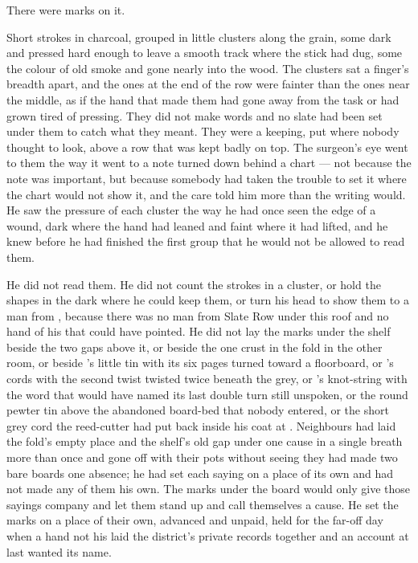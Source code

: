 There were marks on it.

Short strokes in charcoal, grouped in little clusters along the grain, some dark and pressed hard enough to leave a smooth track where the stick had dug, some the colour of old smoke and gone nearly into the wood. The clusters sat a finger's breadth apart, and the ones at the end of the row were fainter than the ones near the middle, as if the hand that made them had gone away from the task or had grown tired of pressing. They did not make  words and no slate had been set under them to catch what they meant. They were a keeping, put where nobody thought to look, above a row that was kept badly on top. The surgeon's eye went to them the way it went to a note turned down behind a chart --- not because the note was important, but because somebody had taken the trouble to set it where the chart would not show it, and the care told him more than the writing would. He saw the pressure of each cluster the way he had once seen the edge of a wound, dark where the hand had leaned and faint where it had lifted, and he knew before he had finished the first group that he would not be allowed to read them.

He did not read them. He did not count the strokes in a cluster, or hold the shapes in the dark where he could keep them, or turn his head to show them to a man from , because there was no man from Slate Row under this roof and no hand of his that could have pointed. He did not lay the marks under the shelf beside the two gaps above it, or beside the one crust in the fold in the other room, or beside 's little tin with its six pages turned toward a floorboard, or 's cords with the second twist twisted twice beneath the grey, or 's knot-string with the word that would have named its last double turn still unspoken, or the round pewter tin above the abandoned board-bed that nobody entered, or the short grey cord the reed-cutter had put back inside his coat at . Neighbours had laid the fold's empty place and the shelf's old gap under one cause in a single breath more than once and gone off with their pots without seeing they had made two bare boards one absence; he had set each saying on a place of its own and had not made any of them his own. The marks under the board would only give those sayings company and let them stand up and call themselves a cause. He set the marks on a place of their own, advanced and unpaid, held for the far-off day when a hand not his laid the district's private records together and an account at last wanted its name.

